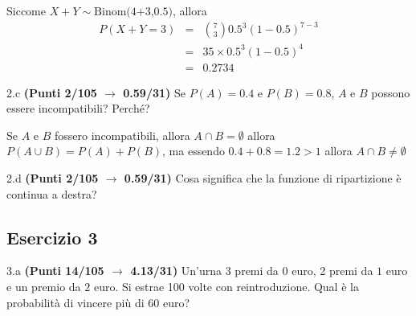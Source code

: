 \documentclass[
  11pt,
]{book}
\theoremstyle{mytheoremstyle}
\theoremstyle{mydefstyle}
\newenvironment{sol}
  {
  \begin{tcolorbox}[enhanced,breakable,arc=0.1mm,boxrule=1pt,colback=white,colframe=iblue,
  title=\bf \fontfamily{lmss}\selectfont \hspace{.5 cm} Soluzione,drop fuzzy shadow]

}{
\end{tcolorbox}
  }
\begin{document}
\begin{sol}
Siccome \(X+Y\sim\text{Binom(4+3,0.5)}\), allora
\normalsize 
\begin{eqnarray*}
      P( X+Y = 3 ) &=& \binom{ 7 }{ 3 } 0.5 ^{ 3 }(1- 0.5 )^{ 7 - 3 } \\                 &=& 35 \times 0.5 ^{ 3 }(1- 0.5 )^{ 4 } \\                 &=& 0.2734 
   \end{eqnarray*}
\normalsize 

\end{sol}

2.c \textbf{(Punti 2/105 \(\rightarrow\) 0.59/31)} Se \(P(A)=0.4\) e \(P(B)=0.8\), \(A\) e \(B\) possono essere incompatibili? Perché?

\begin{sol}
Se \(A\) e \(B\) fossero incompatibili, allora \(A\cap B=\emptyset\) allora \(P(A\cup B)=P(A)+P(B)\), ma essendo \(0.4+0.8=1.2>1\) allora \(A\cap B\neq\emptyset\)

\end{sol}

2.d \textbf{(Punti 2/105 \(\rightarrow\) 0.59/31)} Cosa significa che la funzione di ripartizione è continua a destra?

\subsection{Esercizio 3}\label{esercizio-3-33}

3.a \textbf{(Punti 14/105 \(\rightarrow\) 4.13/31)} Un'urna 3 premi da \(\mbox{0}\) euro, 2 premi da \(\mbox{1}\) euro e un premio da \(\mbox{2}\) euro.
Si estrae 100 volte con reintroduzione.
Qual è la probabilità di vincere più di 60 euro?
\end{document}
